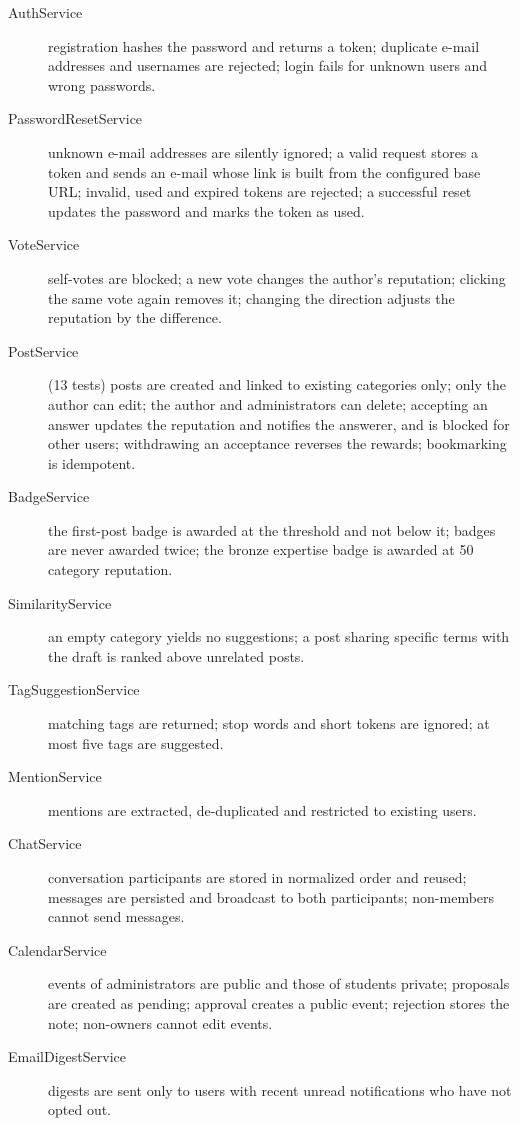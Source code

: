 \begin{description}
  \item[AuthService] registration hashes the password and returns a token; duplicate
    e-mail addresses and usernames are rejected; login fails for unknown users and wrong
    passwords.
  \item[PasswordResetService] unknown e-mail addresses are silently ignored; a valid
    request stores a token and sends an e-mail whose link is built from the configured
    base URL; invalid, used and expired tokens are
    rejected; a successful reset updates the password and marks the token as used.
  \item[VoteService] self-votes are blocked; a new vote changes the author's reputation;
    clicking the same vote again removes it; changing the direction adjusts the
    reputation by the difference.
  \item[PostService] (13 tests) posts are created and linked to existing categories only;
    only the author can edit; the author and administrators can delete; accepting an
    answer updates the reputation and notifies the answerer, and is blocked for other
    users; withdrawing an acceptance reverses the rewards; bookmarking is idempotent.
  \item[BadgeService] the first-post badge is awarded at the threshold and not below it;
    badges are never awarded twice; the bronze expertise badge is awarded at 50 category
    reputation.
  \item[SimilarityService] an empty category yields no suggestions; a post sharing
    specific terms with the draft is ranked above unrelated posts.
  \item[TagSuggestionService] matching tags are returned; stop words and short tokens are
    ignored; at most five tags are suggested.
  \item[MentionService] mentions are extracted, de-duplicated and restricted to existing
    users.
  \item[ChatService] conversation participants are stored in normalized order and
    reused; messages are persisted and broadcast to both participants; non-members cannot
    send messages.
  \item[CalendarService] events of administrators are public and those of students
    private; proposals are created as pending; approval creates a public event; rejection
    stores the note; non-owners cannot edit events.
  \item[EmailDigestService] digests are sent only to users with recent unread
    notifications who have not opted out.
\end{description}


